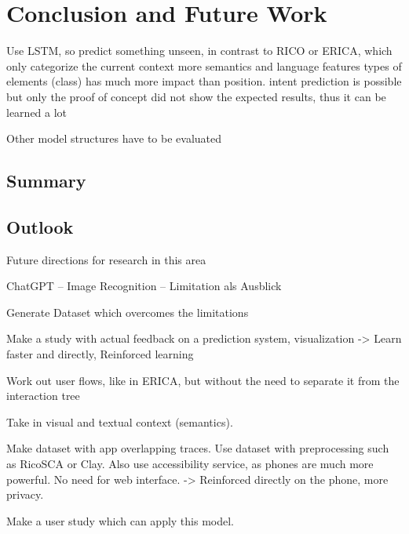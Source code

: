 \chapter{Conclusion and Future Work}
\label{sec:zusfas}

Use LSTM, so predict something unseen, in contrast to RICO or ERICA, which only categorize the current context
more semantics and language features
types of elements (class) has much more impact than position.
intent prediction is possible but only
the proof of concept did not show the expected results, thus it can be learned a lot

Other model structures have to be evaluated

\section*{Summary}
\section*{Outlook}

Future directions for research in this area

ChatGPT – Image Recognition – Limitation als Ausblick

Generate Dataset which overcomes the limitations

Make a study with actual feedback on a prediction system, visualization
-> Learn faster and directly, Reinforced learning

Work out user flows, like in ERICA, but without the need to separate it from the interaction tree

Take in visual and textual context (semantics).

Make dataset with app overlapping traces.
Use dataset with preprocessing such as RicoSCA or Clay.
Also use accessibility service, as phones are much more powerful.
No need for web interface.
-> Reinforced directly on the phone, more privacy.

Make a user study which can apply this model.
